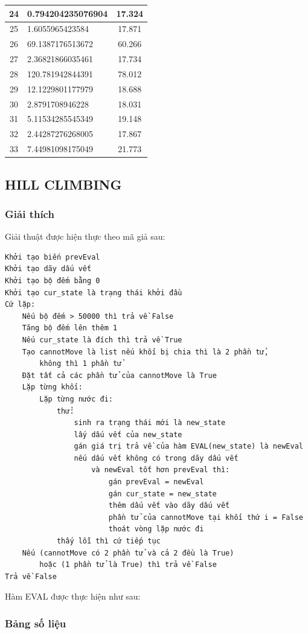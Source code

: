 \documentclass[a4paper, 11pt]{article}
\begin{document}
\begin{center}
\begin{tabular}{|c|l|c|}
		24       & 0.794204235076904 & 17.324       \\ \hline
		25       & 1.6055965423584   & 17.871       \\ \hline
		26       & 69.1387176513672  & 60.266       \\ \hline
		27       & 2.36821866035461  & 17.734       \\ \hline
		28       & 120.781942844391  & 78.012       \\ \hline
		29       & 12.1229801177979  & 18.688       \\ \hline
		30       & 2.8791708946228   & 18.031       \\ \hline
		31       & 5.11534285545349  & 19.148       \\ \hline
		32       & 2.44287276268005  & 17.867       \\ \hline
		33       & 7.44981098175049  & 21.773       \\ \hline
	\end{tabular}
\end{center}
\subsection{HILL CLIMBING}
\subsubsection{Giải thích}
Giải thuật được hiện thực theo mã giả sau:
\begin{verbatim}
Khởi tạo biến prevEval
Khởi tạo dãy dấu vết
Khởi tạo bộ đếm bằng 0
Khởi tạo cur_state là trạng thái khởi đầu
Cứ lặp:
    Nếu bộ đếm > 50000 thì trả về False
    Tăng bộ đếm lên thêm 1
    Nếu cur_state là đích thì trả về True
    Tạo cannotMove là list nếu khối bị chia thì là 2 phần tử, 
        không thì 1 phần tử
    Đặt tất cả các phần tử của cannotMove là True
    Lặp từng khối:
        Lặp từng nước đi:
            thử:
                sinh ra trạng thái mới là new_state
                lấy dấu vết của new_state
                gán giá trị trả về của hàm EVAL(new_state) là newEval 
                nếu dấu vết không có trong dãy dấu vết 
                    và newEval tốt hơn prevEval thì:
                        gán prevEval = newEval
                        gán cur_state = new_state
                        thêm dấu vết vào dãy dấu vết
                        phần tử của cannotMove tại khối thứ i = False
                        thoát vòng lặp nước đi
            thấy lỗi thì cứ tiếp tục
    Nếu (cannotMove có 2 phần tử và cả 2 đều là True) 
        hoặc (1 phần tử là True) thì trả về False
Trả về False
\end{verbatim}
Hàm EVAL được thực hiện như sau:
\subsubsection{Bảng số liệu}
\end{document}

